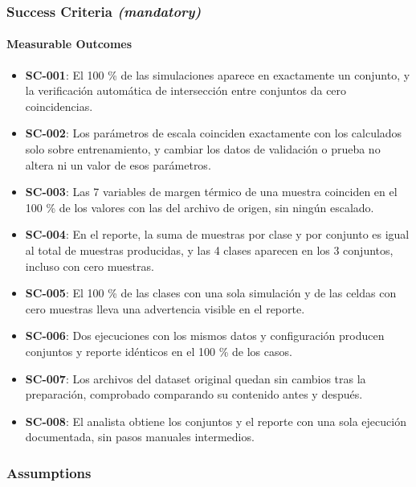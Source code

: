 \documentclass[12pt,a4paper]{article}
\providecommand{\tightlist}{\setlength{\itemsep}{0pt}\setlength{\parskip}{0pt}}
\newenvironment{documentogenerado}[2]{%
  \def\doccomando{#1}\def\docruta{#2}%
  \par\begingroup\small\setstretch{1.15}\sloppy%
}{\endgroup\par\medskip}
\begin{document}
\begin{documentogenerado}{/speckit-specify + /speckit-clarify}{specs\slash 001-preparacion-datos\slash spec.md}
\subsubsection{\texorpdfstring{Success Criteria \emph{(mandatory)}}{Success Criteria (mandatory)}}

\paragraph{Measurable Outcomes}

\begin{itemize}
\tightlist
\item
  \textbf{SC-001}: El 100 \% de las simulaciones aparece en exactamente un conjunto, y la verificación automática de intersección entre conjuntos da cero coincidencias.
\item
  \textbf{SC-002}: Los parámetros de escala coinciden exactamente con los calculados solo sobre entrenamiento, y cambiar los datos de validación o prueba no altera ni un valor de esos parámetros.
\item
  \textbf{SC-003}: Las 7 variables de margen térmico de una muestra coinciden en el 100 \% de los valores con las del archivo de origen, sin ningún escalado.
\item
  \textbf{SC-004}: En el reporte, la suma de muestras por clase y por conjunto es igual al total de muestras producidas, y las 4 clases aparecen en los 3 conjuntos, incluso con cero muestras.
\item
  \textbf{SC-005}: El 100 \% de las clases con una sola simulación y de las celdas con cero muestras lleva una advertencia visible en el reporte.
\item
  \textbf{SC-006}: Dos ejecuciones con los mismos datos y configuración producen conjuntos y reporte idénticos en el 100 \% de los casos.
\item
  \textbf{SC-007}: Los archivos del dataset original quedan sin cambios tras la preparación, comprobado comparando su contenido antes y después.
\item
  \textbf{SC-008}: El analista obtiene los conjuntos y el reporte con una sola ejecución documentada, sin pasos manuales intermedios.
\end{itemize}

\subsubsection{Assumptions}


\end{documentogenerado}
\end{document}
